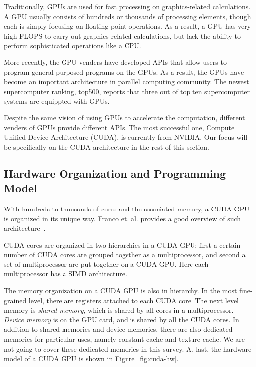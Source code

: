 Traditionally, GPUs are used for fast processing on 
graphics-related calculations.
%
A GPU usually consists of hundreds or thousands of processing elements,
though each is simply focusing on floating point operations. 
%
As a result, a GPU has very high FLOPS to carry out graphics-related
calculations, but lack the ability to 
perform sophisticated operations like a CPU.


More recently, the GPU venders have developed APIs that allow users
to program general-purposed programs on the GPUs. 
%
As a result, the GPUs have become an important architecture in 
parallel computing community.
%
The newest supercomputer ranking, top500, reports that three out of 
top ten supercomputer systems are equippted with GPUs.


Despite the same vision of using GPUs to accelerate the computation,
different venders of GPUs provide different APIs. 
%
The most successful one, Compute Unified Device Architecture (CUDA), 
is currently from NVIDIA.
%
Our focus will be specifically on the CUDA architecture in the rest 
of this section.


\subsection{Hardware Organization and Programming Model}
\label{sec:cuda-model}
%
With hundreds to thousands of cores and the associated memory, 
a CUDA GPU is organized in its unique way. 
%
Franco et. al. provides a good overview of such 
architecture~\cite{franco2009parallel}.


CUDA cores are organized in two hierarchies in a CUDA GPU:
first a certain number of CUDA cores are grouped together as a multiprocessor,
and second a set of multiprocessor are put together on a CUDA GPU.
%
Here each multiprocessor has a SIMD architecture.


The memory organization on a CUDA GPU is also in hierarchy.
%
In the most fine-grained level, there are registers attached to each CUDA core.
%
The next level memory is \textit{shared memory}, which is shared by all cores
in a multiprocessor.
%
\textit{Device memory} is on the GPU card, and is shared by all the CUDA cores.
%
In addition to shared memories and device memories, there are also dedicated 
memories for particular uses, namely constant cache and texture cache.
%
We are not going to cover these dedicated memories in this survey.
%
At last, the hardware model of a CUDA GPU is shown in Figure~\ref{fig:cuda-hw}.
%

